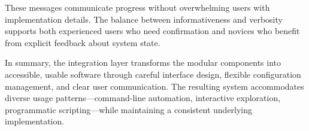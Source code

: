 These messages communicate progress without overwhelming users with implementation details. The balance between informativeness and verbosity supports both experienced users who need confirmation and novices who benefit from explicit feedback about system state.

In summary, the integration layer transforms the modular components into accessible, usable software through careful interface design, flexible configuration management, and clear user communication. The resulting system accommodates diverse usage patterns—command-line automation, interactive exploration, programmatic scripting—while maintaining a consistent underlying implementation.
